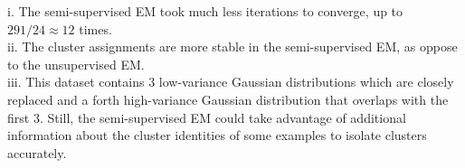 \begin{answer}
i. The semi-supervised EM took much less iterations to converge, up to $291/24 \approx 12$ times. \\
ii. The cluster assignments are more stable in the semi-supervised EM, as oppose to the unsupervised EM. \\
iii. This dataset contains 3 low-variance Gaussian distributions which are closely replaced and a forth high-variance Gaussian distribution that overlaps with the first 3. Still, the semi-supervised EM could take advantage of additional information about the cluster identities of some examples to isolate clusters accurately. \\
\end{answer}
